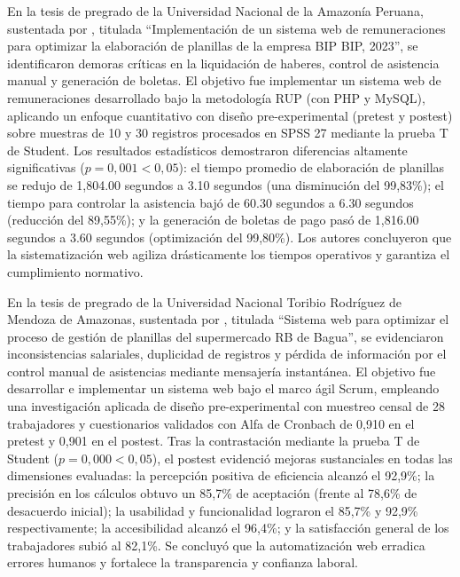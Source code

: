 En la tesis de pregrado de la Universidad Nacional de la Amazonía Peruana, sustentada por \textcite{fernandez2023implementacion}, 
titulada ``Implementación de un sistema web de remuneraciones para optimizar la elaboración de planillas de la empresa BIP BIP, 2023'', 
se identificaron demoras críticas en la liquidación de haberes, control de asistencia manual y generación de boletas. El objetivo fue implementar 
un sistema web de remuneraciones desarrollado bajo la metodología RUP (con PHP y MySQL), aplicando un enfoque cuantitativo con diseño pre-experimental 
(pretest y postest) sobre muestras de 10 y 30 registros procesados en SPSS 27 mediante la prueba T de Student. Los resultados estadísticos demostraron 
diferencias altamente significativas ($p = 0,001 < 0,05$): el tiempo promedio de elaboración de planillas se redujo de 1,804.00 segundos a 3.10 segundos 
(una disminución del 99,83\%); el tiempo para controlar la asistencia bajó de 60.30 segundos a 6.30 segundos (reducción del 89,55\%); y la generación 
de boletas de pago pasó de 1,816.00 segundos a 3.60 segundos (optimización del 99,80\%). Los autores concluyeron que la sistematización web agiliza 
drásticamente los tiempos operativos y garantiza el cumplimiento normativo.

En la tesis de pregrado de la Universidad Nacional Toribio Rodríguez de Mendoza de Amazonas, sustentada por \textcite{suarez2025sistema}, 
titulada ``Sistema web para optimizar el proceso de gestión de planillas del supermercado RB de Bagua'', se evidenciaron inconsistencias salariales, 
duplicidad de registros y pérdida de información por el control manual de asistencias mediante mensajería instantánea. El objetivo fue desarrollar 
e implementar un sistema web bajo el marco ágil Scrum, empleando una investigación aplicada de diseño pre-experimental con muestreo censal de 
28 trabajadores y cuestionarios validados con Alfa de Cronbach de 0,910 en el pretest y 0,901 en el postest. Tras la contrastación mediante 
la prueba T de Student ($p = 0,000 < 0,05$), el postest evidenció mejoras sustanciales en todas las dimensiones evaluadas: 
la percepción positiva de eficiencia alcanzó el 92,9\%; la precisión en los cálculos obtuvo un 85,7\% de aceptación (frente al 78,6\% de desacuerdo inicial); 
la usabilidad y funcionalidad lograron el 85,7\% y 92,9\% respectivamente; la accesibilidad alcanzó el 96,4\%; y la satisfacción general 
de los trabajadores subió al 82,1\%. Se concluyó que la automatización web erradica errores humanos y fortalece la transparencia y confianza laboral.
